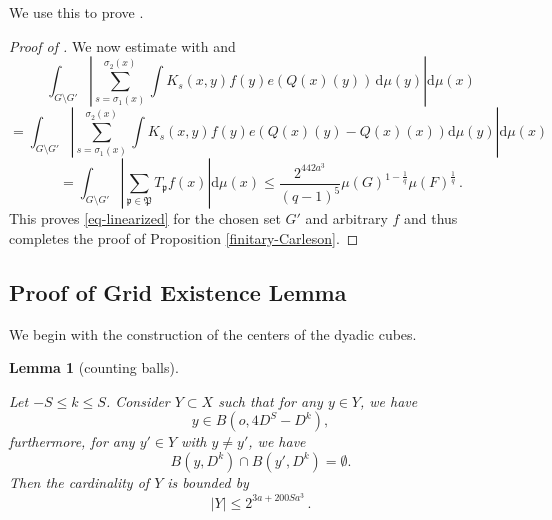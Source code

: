 \documentclass[10pt,a4paper]{article}
\theoremstyle{plain}
\newtheorem{lemma}[theorem]{Lemma}
\theoremstyle{definition}
\numberwithin{equation}{subsection}
\newcommand{\fp}{{\mathfrak p}}
\newcommand{\fP}{{\mathfrak P}}
\newcommand{\tQ}{{Q}}
\newcommand{\lean}[1]{}
\newcommand{\proves}[1]{}
\newcommand{\leanok}{}
\begin{document}
We use this to prove .
\begin{proof}[Proof of ]
\proves{finitary-Carleson}
\leanok
We now estimate with  and 
\begin{equation}
 \int_{G \setminus G'} \left|\sum_{s={\sigma_1}(x)}^{{\sigma_2}(x)} \int K_s(x,y) f(y) e(\tQ(x)(y)) \, \mathrm{d}\mu(y)\right| \mathrm{d}\mu(x)
\end{equation}
\begin{equation}
 =\int_{G \setminus G'} \left|\sum_{s={\sigma_1}(x)}^{{\sigma_2}(x)} \int K_s(x,y) f(y) e(\tQ(x)(y) - \tQ(x)(x))\mathrm{d}\mu(y)\right| \mathrm{d}\mu(x)
\end{equation}
\begin{equation}
 =\int_{G \setminus G'} \left|\sum_{\fp\in \fP}T_{\fp} f(x)\right| \mathrm{d}\mu(x)
 \le \frac{2^{442a^3}}{(q-1)^5} \mu(G)^{1 - \frac{1}{q}} \mu(F)^{\frac{1}{q}} \,.
\end{equation}
This proves \eqref{eq-linearized} for the chosen set $G'$ and arbitrary $f$ and thus completes the proof of Proposition
\ref{finitary-Carleson}.
\end{proof}


\subsection{Proof of Grid Existence Lemma}
\label{subsecdyadic}

We begin with the construction of the centers of the dyadic cubes.
\begin{lemma}[counting balls]
    \label{counting-balls}
    \leanok
    \lean{counting_balls}
    Let $-S\le k\le S$. Consider $Y\subset X$ such that for any $y\in Y$, we have
    \begin{equation}\label{ybinb}
    y\in B(o,4D^S-D^k),
    \end{equation}
    furthermore, for any $y'\in Y$ with $y\neq y'$, we have
    \begin{equation} \label{eq-disj-yballs}
        B(y,D^k)\cap B(y',D^k)=\emptyset.
    \end{equation}
    Then the cardinality of $Y$ is bounded by
    \begin{equation}\label{boundY}
        |Y|\le 2^{3a + 200Sa^3}\, .
    \end{equation}
\end{lemma}
\end{document}
